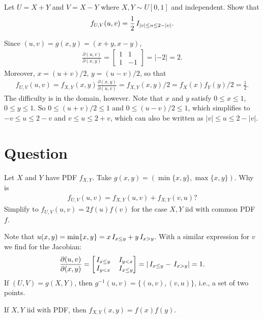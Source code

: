 \begin{exercise}
Let $U=X+Y$ and $V=X-Y$ where $X,Y\sim U[0,1]$ and independent. Show that
\begin{align*}
f_{U,V}(u,v) = \frac 12 \,I_{|v| \leq u \leq 2-|v|}.
\end{align*}
\begin{solution}
Since $(u,v) = g(x,y)  = (x+y, x-y)$,
\begin{align*}
\frac{\partial(u,v)}{\partial(x,y)} =
\begin{bmatrix}
1 & 1 \\
1 & -1
\end{bmatrix} = |-2| =2.
\end{align*}
Moreover, $x=(u+v)/2$, $y=(u-v)/2$, so that
\begin{align*}
f_{U,V}(u,v) = f_{X,Y}(x,y) \frac{\partial(x,y)}{\partial(u,v)} = f_{X,Y}(x,y)/2 = f_X(x) f_Y(y)/2 = \frac 1 2.
\end{align*}
The difficulty is in the domain, however. Note that $x$ and $y$ satisfy $0 \leq x \leq 1$, $0 \leq y \leq 1$.
So $0 \leq (u+v)/2 \leq 1$ and $0 \leq (u-v)/2 \leq 1$, which simplifies to $-v \leq u \leq 2-v$ and $v \leq u \leq 2+v$, which can also be written as $|v| \leq u \leq 2-|v|$.
\end{solution}
\end{exercise}

\section{Question}

\begin{exercise}
Let $X$ and $Y$ have PDF $f_{X,Y}$. Take $g(x,y) = (\min\{x,y\}, \max\{x,y\})$.
Why is
\begin{align*}
f_{U,V}(u,v) = f_{X,Y}(u, v) + f_{X,Y}(v, u)?
\end{align*}
Simplify to $f_{U,V}(u,v) = 2f(u)f(v)$ for the case $X, Y$ iid with common PDF $f$.
\begin{solution}
Note that $u(x,y)=\min\{x,y\} = x\,I_{x\leq y} + y\,I_{x> y}$. With a similar expression for $v$ we find for the Jacobian:
\begin{align*}
\frac{\partial(u,v)}{\partial(x,y)} =
\begin{bmatrix}
\,I_{x\leq y} & \,I_{y < x} \\
\,I_{y<x} & \,I_{x\leq y}
\end{bmatrix} = |\,I_{x\leq y} - \,I_{x>y}| = 1.
\end{align*}
If $(U,V) = g(X,Y)$, then $g^{-1}(u,v) = \{(u,v), (v,u)\}$, i.e., a set of two points.

If $X,Y$ iid with PDF, then $f_{X,Y}(x,y) = f(x)f(y)$.
\end{solution}
\end{exercise}

